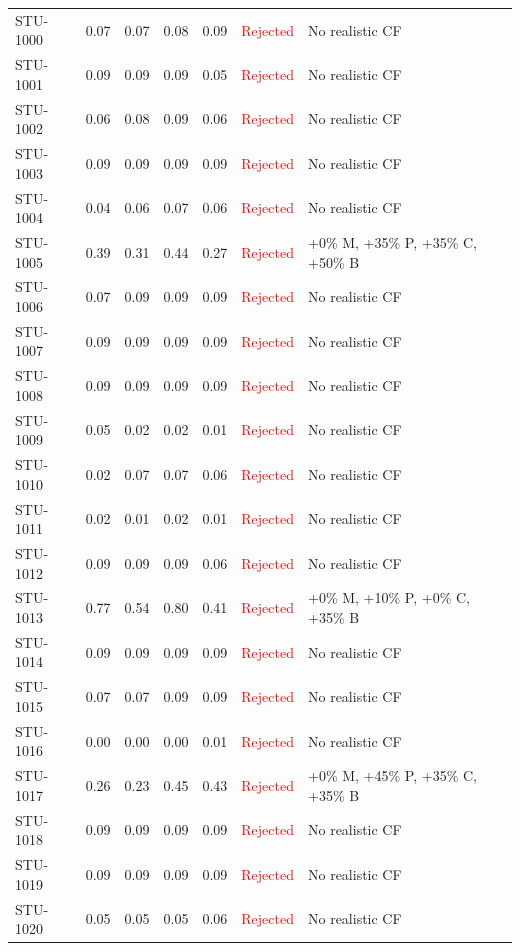 \begin{longtable}{l c c c c | c | l}
STU-1000 & 0.07 & 0.07 & 0.08 & 0.09 & \textcolor{red}{Rejected} & No realistic CF \\
STU-1001 & 0.09 & 0.09 & 0.09 & 0.05 & \textcolor{red}{Rejected} & No realistic CF \\
STU-1002 & 0.06 & 0.08 & 0.09 & 0.06 & \textcolor{red}{Rejected} & No realistic CF \\
STU-1003 & 0.09 & 0.09 & 0.09 & 0.09 & \textcolor{red}{Rejected} & No realistic CF \\
STU-1004 & 0.04 & 0.06 & 0.07 & 0.06 & \textcolor{red}{Rejected} & No realistic CF \\
STU-1005 & 0.39 & 0.31 & 0.44 & 0.27 & \textcolor{red}{Rejected} & +0\% M, +35\% P, +35\% C, +50\% B \\
STU-1006 & 0.07 & 0.09 & 0.09 & 0.09 & \textcolor{red}{Rejected} & No realistic CF \\
STU-1007 & 0.09 & 0.09 & 0.09 & 0.09 & \textcolor{red}{Rejected} & No realistic CF \\
STU-1008 & 0.09 & 0.09 & 0.09 & 0.09 & \textcolor{red}{Rejected} & No realistic CF \\
STU-1009 & 0.05 & 0.02 & 0.02 & 0.01 & \textcolor{red}{Rejected} & No realistic CF \\
STU-1010 & 0.02 & 0.07 & 0.07 & 0.06 & \textcolor{red}{Rejected} & No realistic CF \\
STU-1011 & 0.02 & 0.01 & 0.02 & 0.01 & \textcolor{red}{Rejected} & No realistic CF \\
STU-1012 & 0.09 & 0.09 & 0.09 & 0.06 & \textcolor{red}{Rejected} & No realistic CF \\
STU-1013 & 0.77 & 0.54 & 0.80 & 0.41 & \textcolor{red}{Rejected} & +0\% M, +10\% P, +0\% C, +35\% B \\
STU-1014 & 0.09 & 0.09 & 0.09 & 0.09 & \textcolor{red}{Rejected} & No realistic CF \\
STU-1015 & 0.07 & 0.07 & 0.09 & 0.09 & \textcolor{red}{Rejected} & No realistic CF \\
STU-1016 & 0.00 & 0.00 & 0.00 & 0.01 & \textcolor{red}{Rejected} & No realistic CF \\
STU-1017 & 0.26 & 0.23 & 0.45 & 0.43 & \textcolor{red}{Rejected} & +0\% M, +45\% P, +35\% C, +35\% B \\
STU-1018 & 0.09 & 0.09 & 0.09 & 0.09 & \textcolor{red}{Rejected} & No realistic CF \\
STU-1019 & 0.09 & 0.09 & 0.09 & 0.09 & \textcolor{red}{Rejected} & No realistic CF \\
STU-1020 & 0.05 & 0.05 & 0.05 & 0.06 & \textcolor{red}{Rejected} & No realistic CF \\

\end{longtable}
